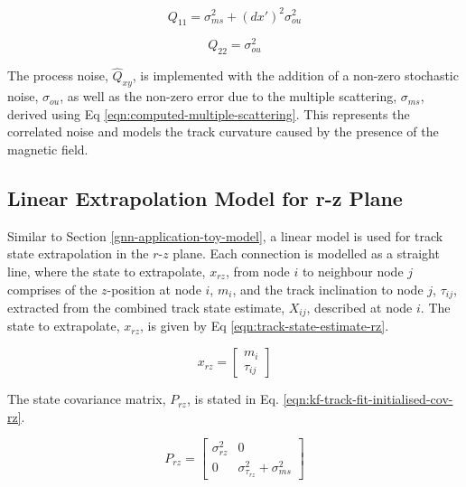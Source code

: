 \begin{equation}
Q_{11} = \sigma_{ms}^2 + (dx')^{2} \sigma_{ou}^{2}
\label{eqn:q22}
\end{equation}

\begin{equation}
Q_{22} = \sigma_{ou}^2
\label{eqn:q22}
\end{equation}

The process noise, $\hat{Q}_{xy}$, is implemented with the addition of a non-zero stochastic noise, $\sigma_{ou}$, as well as the non-zero error due to the multiple scattering, $\sigma_{ms}$, derived using Eq \eqref{eqn:computed-multiple-scattering}. This represents the correlated noise and models the track curvature caused by the presence of the magnetic field.














\clearpage
\subsection{Linear Extrapolation Model for r-z Plane}
\label{chapter-6-r-z-plane-impl}


Similar to Section \ref{gnn-application-toy-model}, a linear model is used for track state extrapolation in the $r$-$z$ plane. Each connection is modelled as a straight line, where the state to extrapolate, $x_{rz}$, from node $i$ to neighbour node $j$ comprises of the $z$-position at node $i$, $m_i$, and the track inclination to node $j$, $\tau_{ij}$, extracted from the combined track state estimate, $X_{ij}$, described at node $i$. The state to extrapolate, $x_{rz}$, is given by Eq \eqref{eqn:track-state-estimate-rz}.

\begin{equation}
x_{rz} = \begin{bmatrix} m_i \\ \tau_{ij} \end{bmatrix}
\label{eqn:track-state-estimate-rz}
\end{equation}


The state covariance matrix, $P_{rz}$, is stated in Eq. \eqref{eqn:kf-track-fit-initialised-cov-rz}.  

\begin{equation}
P_{rz} = \begin{bmatrix} \sigma_{rz}^2 & 0 \\ 0 & \sigma_{\tau_{rz}}^2 + \sigma_{ms}^2 \end{bmatrix} 
\label{eqn:kf-track-fit-initialised-cov-rz}
\end{equation}

